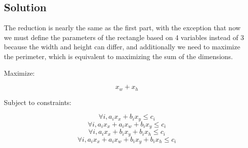 \documentclass{article}
\begin{document}
\subsection{Solution}

The reduction is nearly the same as the first part, with the exception that
now we must define the parameters of the rectangle based on 4 variables
instead of 3 because the width and height can differ, and additionally we need
to maximize the perimeter, which is equivalent to maximizing the sum of the
dimensions.

Maximize: 

$$x_w + x_h$$

Subject to constraints:

$$\forall i, a_i x_x + b_i x_y \leq c_i$$
$$\forall i, a_i x_x + a_i x_w + b_i x_y \leq c_i$$
$$\forall i, a_i x_x + b_i x_y + b_i x_h \leq c_i$$
$$\forall i, a_i x_x + a_i x_w + b_i x_y + b_i x_h \leq c_i$$
\end{document}
